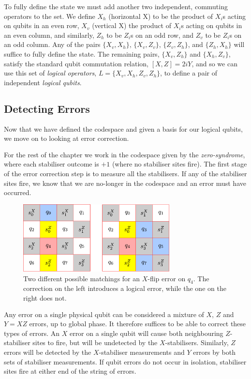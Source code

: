 To fully define the state we must add another two independent, commuting operators to the set. We define $X_h$ (horizontal X) to be the product of $X_i$s acting on qubits in an even row, $X_v$ (vertical X) the product of $X_i$s acting on qubits in an even column, and similarly, $Z_h$ to be $Z_i$s on an odd row, and $Z_v$ to be $Z_i$s on an odd column. Any of the pairs $\{X_v, X_h\}$, $\{X_v, Z_v\}$, $\{Z_v, Z_h\}$, and $\{Z_h, X_h\}$ will suffice to fully define the state. The remaining pairs, $\{X_v, Z_h\}$ and $\{X_h, Z_v\}$, satisfy the standard qubit commutation relation, $[X, Z] = 2iY$, and so we can use this set of \textit{logical operators}, $L = \{X_v, X_h, Z_v , Z_h\}$, to define a pair of independent \textit{logical qubits}. 

\subsection{Detecting Errors}

Now that we have defined the codespace and given a basis for our logical qubits, we move on to looking at error correction.

For the rest of the chapter we work in the codespace given by the \textit{zero-syndrome}, where each stabiliser outcome is $+1$ (where no stabiliser sites fire). The first stage of the error correction step is to measure all the stabilisers. If any of the stabiliser sites fire, we know that we are no-longer in the codespace and an error must have occurred.

\begin{figure}[htb]
  \begin{center}
    \includegraphics[width=8cm]{assets/4-code_error_correct.pdf}
  \end{center}
  \caption{Two different possible matchings for an $X$-flip error on $q_4$. The correction on the left introduces a logical error, while the one on the right does not.}
  \label{4-code_error_correct}
\end{figure}

Any error on a single physical qubit can be considered a mixture of $X$, $Z$ and $Y = XZ$ errors, up to global phase. It therefore suffices to be able to correct these types of errors. An $X$ error on a single qubit will cause both neighbouring $Z$-stabiliser sites to fire, but will be undetected by the $X$-stabilisers. Similarly, $Z$ errors will be detected by the $X$-stabiliser measurements and $Y$ errors by both sets of stabiliser measurements. If qubit errors do not occur in isolation, stabiliser sites fire at either end of the string of errors. 

